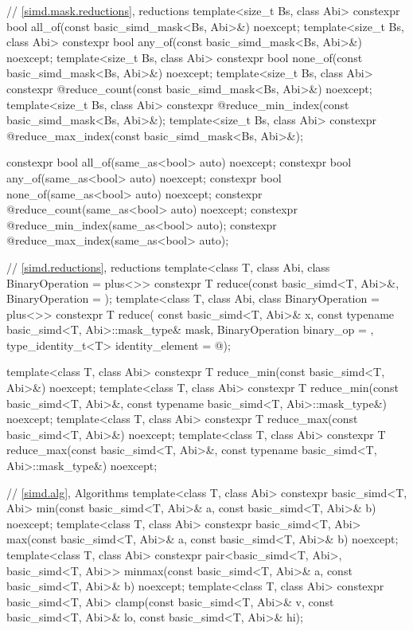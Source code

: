 \begin{codeblock}
{  // \ref{simd.mask.reductions},  reductions
  template<size_t Bs, class Abi>
    constexpr bool all_of(const basic_simd_mask<Bs, Abi>&) noexcept;
  template<size_t Bs, class Abi>
    constexpr bool any_of(const basic_simd_mask<Bs, Abi>&) noexcept;
  template<size_t Bs, class Abi>
    constexpr bool none_of(const basic_simd_mask<Bs, Abi>&) noexcept;
  template<size_t Bs, class Abi>
    constexpr @\simdsizetype@ reduce_count(const basic_simd_mask<Bs, Abi>&) noexcept;
  template<size_t Bs, class Abi>
    constexpr @\simdsizetype@ reduce_min_index(const basic_simd_mask<Bs, Abi>&);
  template<size_t Bs, class Abi>
    constexpr @\simdsizetype@ reduce_max_index(const basic_simd_mask<Bs, Abi>&);

  constexpr bool all_of(same_as<bool> auto) noexcept;
  constexpr bool any_of(same_as<bool> auto) noexcept;
  constexpr bool none_of(same_as<bool> auto) noexcept;
  constexpr @\simdsizetype@ reduce_count(same_as<bool> auto) noexcept;
  constexpr @\simdsizetype@ reduce_min_index(same_as<bool> auto);
  constexpr @\simdsizetype@ reduce_max_index(same_as<bool> auto);

  // \ref{simd.reductions},  reductions
  template<class T, class Abi, class BinaryOperation = plus<>>
    constexpr T reduce(const basic_simd<T, Abi>&, BinaryOperation = {});
  template<class T, class Abi, class BinaryOperation = plus<>>
    constexpr T reduce(
      const basic_simd<T, Abi>& x, const typename basic_simd<T, Abi>::mask_type& mask,
      BinaryOperation binary_op = {}, type_identity_t<T> identity_element = @\seebelow@);

  template<class T, class Abi>
    constexpr T reduce_min(const basic_simd<T, Abi>&) noexcept;
  template<class T, class Abi>
    constexpr T reduce_min(const basic_simd<T, Abi>&,
                           const typename basic_simd<T, Abi>::mask_type&) noexcept;
  template<class T, class Abi>
    constexpr T reduce_max(const basic_simd<T, Abi>&) noexcept;
  template<class T, class Abi>
    constexpr T reduce_max(const basic_simd<T, Abi>&,
                           const typename basic_simd<T, Abi>::mask_type&) noexcept;

  // \ref{simd.alg}, Algorithms
  template<class T, class Abi>
    constexpr basic_simd<T, Abi>
      min(const basic_simd<T, Abi>& a, const basic_simd<T, Abi>& b) noexcept;
  template<class T, class Abi>
    constexpr basic_simd<T, Abi>
      max(const basic_simd<T, Abi>& a, const basic_simd<T, Abi>& b) noexcept;
  template<class T, class Abi>
    constexpr pair<basic_simd<T, Abi>, basic_simd<T, Abi>>
      minmax(const basic_simd<T, Abi>& a, const basic_simd<T, Abi>& b) noexcept;
  template<class T, class Abi>
    constexpr basic_simd<T, Abi>
      clamp(const basic_simd<T, Abi>& v, const basic_simd<T, Abi>& lo,
            const basic_simd<T, Abi>& hi);

}
\end{codeblock}
